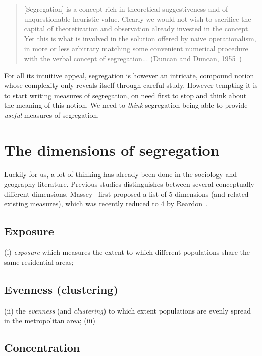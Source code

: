 \begin{quote}
    [Segregation] is a concept rich in theoretical suggestiveness and of
    unquestionable heuristic value. Clearly we would not wish to sacrifice the
    capital of theoretization and observation already invested in the concept.
    Yet this is what is involved in the solution offered by naive
    operationalism, in more or less arbitrary matching some convenient numerical
    procedure with the verbal concept of segregation... (Duncan and Duncan,
    1955~\cite{Duncan:1955})
\end{quote}

For all its intuitive appeal, segregation is however an intricate, compound
notion whose complexity only reveals itself through careful study. However
tempting it is to start writing measures of segregation, on need first to stop
and think about the meaning of this notion. We need to \emph{think} segregation
being able to provide \emph{useful} measures of segregation.


\section{The dimensions of segregation}
\label{sec:the_dimensions_of_segregation}

Luckily for us, a lot of thinking has already been done in the sociology and
geography literature. Previous studies distinguishes between several conceptually
different dimensions.  Massey~\cite{Massey:1988} first proposed a list of $5$
dimensions (and related existing measures), which was recently reduced to $4$ by
Reardon~\cite{Reardon:2004}. 

\subsection{Exposure}
\label{sub:exposure}

(i) {\it exposure} which measures the extent to
which different populations share the same residential areas; 

\subsection{Evenness (clustering)}
\label{sub:evenness_clustering_}

(ii) the {\it
evenness} (and {\it clustering}) to which extent populations are evenly spread
in the metropolitan area; (iii) 

\subsection{Concentration}
\label{sub:concentration}

